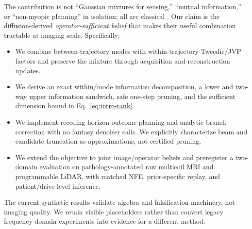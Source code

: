 The contribution is not ``Gaussian mixtures for sensing,'' ``mutual
information,'' or ``non-myopic planning'' in isolation; all are classical
\cite{braun2015infogreedy,huan2016soed,guo2026copex}.  Our claim is the
diffusion-derived \emph{operator-sufficient belief} that makes their useful
combination tractable at imaging scale.  Specifically:
\begin{itemize}
    \item We combine between-trajectory modes with within-trajectory
    Tweedie/JVP factors and preserve the mixture through acquisition and
    reconstruction updates.
    \item We derive an exact within/mode information decomposition, a lower
    and two-way upper information sandwich, safe one-step pruning, and the
    sufficient dimension bound in Eq.~\eqref{eq:intro-rank}.
    \item We implement receding-horizon outcome planning and analytic branch
    correction with no fantasy denoiser calls.  We explicitly characterize
    beam and candidate truncation as approximations, not certified pruning.
    \item We extend the objective to joint image/operator beliefs and
    preregister a two-domain evaluation on pathology-annotated raw multicoil
    MRI and programmable LiDAR, with matched NFE, prior-specific replay, and
    patient/drive-level inference.
\end{itemize}

The current synthetic results validate algebra and falsification machinery,
not imaging quality.  We retain visible placeholders rather than convert
legacy frequency-domain experiments into evidence for a different method.

